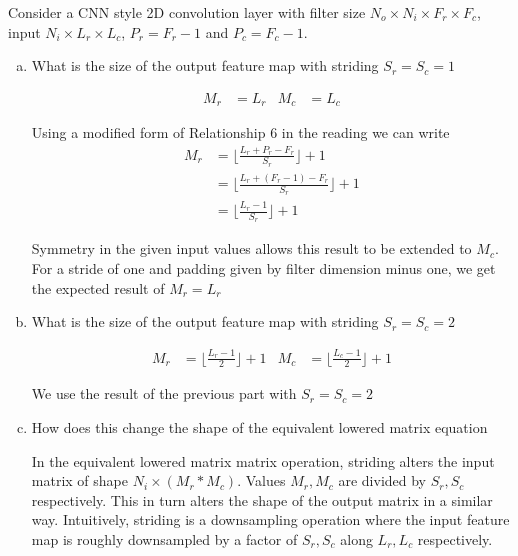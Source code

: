 \documentclass[11pt]{article}
\begin{document}
Consider a CNN style 2D convolution layer with filter size $N_o \times N_i
\times F_r \times F_c$, input $N_i \times L_r \times L_c$, $P_r = F_r-1$ and
$P_c=F_c-1$.

\begin{enumerate}[(a)]\itemsep0pt
	\item What is the size of the output feature map with striding $S_r=S_c=1$
		\begin{solution}
			\begin{align}
				M_r &= L_r
				&
				M_c &= L_c
			\end{align}

			Using a modified form of Relationship 6 in the reading we can write
			\begin{align}
				M_r &= \bigg\lfloor \frac{L_r + P_r - F_r}{S_r} \bigg\rfloor + 1
				\\
				&= \bigg\lfloor \frac{L_r + (F_r-1) - F_r}{S_r} \bigg\rfloor + 1
				\\
				&= \bigg\lfloor \frac{L_r - 1}{S_r} \bigg\rfloor + 1
			\end{align}

			Symmetry in the given input values allows this result to be
			extended to $M_c$. For a stride of one and padding given by filter
			dimension minus one, we get the expected result of $M_r = L_r$

		\end{solution}
	\item What is the size of the output feature map with striding $S_r=S_c=2$
		\begin{solution}
			\begin{align}
				M_r &= \bigg\lfloor \frac{L_r - 1}{2} \bigg\rfloor + 1
				&
				M_c &= \bigg\lfloor \frac{L_c - 1}{2} \bigg\rfloor + 1
			\end{align}

			We use the result of the previous part with $S_r = S_c = 2$


		\end{solution}
	\item How does this change the shape of the equivalent lowered matrix
		equation
		\begin{solution}
			In the equivalent lowered matrix matrix operation, striding alters
			the input matrix of shape $N_i \times (M_r * M_c)$.
			Values $M_r, M_c$ are divided by $S_r, S_c$ respectively. This in
			turn alters the shape of the output matrix in a similar way.
			Intuitively, striding is a downsampling operation where the input
			feature map is roughly downsampled by a factor of $S_r, S_c$
			along $L_r, L_c$ respectively.
		\end{solution}
\end{enumerate}
\end{document}
